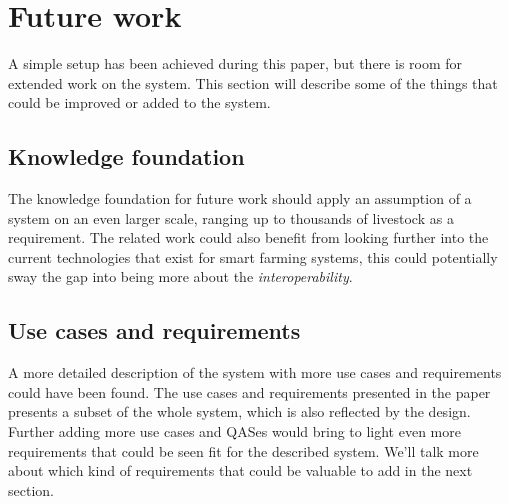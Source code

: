 \section{Future work}
A simple setup has been achieved during this paper, but there is room for extended work on the system. This section will describe some of the things that could be improved or added to the system.

\subsection{Knowledge foundation}
The knowledge foundation for future work should apply an assumption of a system on an even larger scale, ranging up to thousands of livestock as a requirement.
The related work could also benefit from looking further into the current technologies that exist for smart farming systems, this could potentially sway the gap into being more about the \textit{interoperability}.
\subsection{Use cases and requirements}
A more detailed description of the system with more use cases and requirements could have been found. The use cases and requirements presented in the paper presents a subset of the whole system, which is also reflected by the design. Further adding more use cases and QASes would bring to light even more requirements that could be seen fit for the described system. We'll talk more about which kind of requirements that could be valuable to add in the next section.
